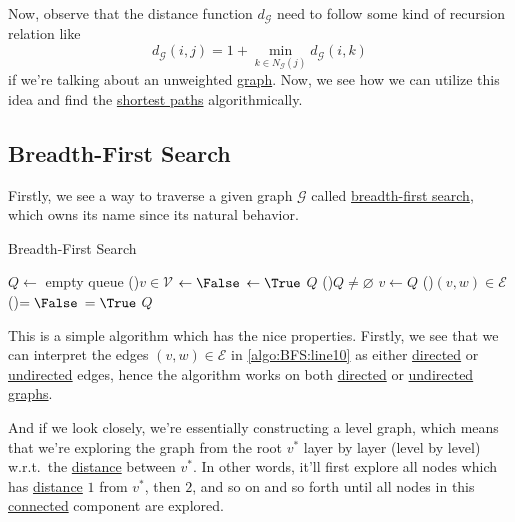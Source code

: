 Now, observe that the distance function \(d_{\mathcal{G} } \) need to follow some kind of recursion relation like
\[
	d_{\mathcal{G} } (i, j) = 1 + \min_{k\in N_{\mathcal{G} } (j)} d_{\mathcal{G} } (i, k)
\]
if we're talking about an unweighted \hyperref[def:graph]{graph}. Now, we see how we can utilize this idea and find the \hyperref[def:shortest-path]{shortest paths} algorithmically.

\subsection{Breadth-First Search}
Firstly, we see a way to traverse a given graph \(\mathcal{G} \) called \hyperref[algo:BFS]{breadth-first search}, which owns its name since its natural behavior.

\begin{algorithm}[H]\label{algo:BFS}
	\DontPrintSemicolon
	\caption{Breadth-First Search}
	\BlankLine
	\(Q\gets \) empty queue
	\For(){\(v\in \mathcal{V} \)}{
		\(\gets \False\)
	}
	\;
	\(\gets \True\) 
	\(Q\)\;
	\;
	\While(){\(Q\neq \varnothing \)}{
		\(v\gets Q\)\pop{}\;
		\For(\label{algo:BFS:line10}){\((v, w)\in\mathcal{E}\)}{
			\If(){\(= \False\)}{
				\(=\True\)
				\(Q\)\;
			}
		}
	}
	\Return{}\;
\end{algorithm}

This is a simple algorithm which has the nice properties. Firstly, we see that we can interpret the edges \((v, w)\in \mathcal{E} \) in \autoref{algo:BFS:line10} as either \hyperref[def:directed-graph]{directed} or \hyperref[def:undirected-graph]{undirected} edges, hence the algorithm works on both \hyperref[def:directed-graph]{directed} or \hyperref[def:undirected-graph]{undirected graphs}.

\begin{intuition}
	And if we look closely, we're essentially constructing a level graph, which means that we're exploring the graph from the root \(v^{\ast} \) layer by layer (level by level) w.r.t.\ the \hyperref[def:distance-between-nodes]{distance} between \(v^{\ast}\). In other words, it'll first explore all nodes which has \hyperref[def:distance-between-nodes]{distance} \(1\) from \(v^{\ast} \), then \(2\), and so on and so forth until all nodes in this \hyperref[def:connected]{connected} component are explored.
\end{intuition}

